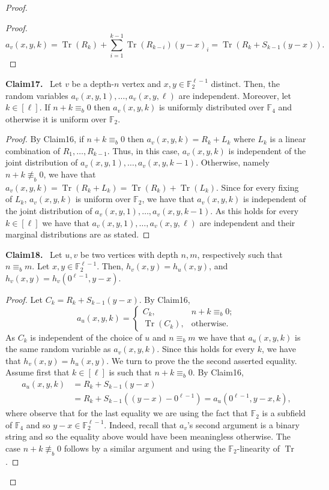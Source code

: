\documentclass[10pt,a4paper]{article}
\newenvironment{authorclaim}[1]{\par\medskip\noindent\textbf{#1.}\ \ignorespaces}{\par\medskip}
\begin{document}
\begin{proof}
\begin{proof}
\[
a_v(x,y,k)=\operatorname{Tr}(R_k)+\sum_{i=1}^{k-1}\operatorname{Tr}(R_{k-i})(y-x)_i
=\operatorname{Tr}(R_k+S_{k-1}(y-x)).
\]
\end{proof}
\begin{authorclaim}{Claim17}
Let $v$ be a depth-$n$ vertex and $x,y\in\mathbb F_2^{\ell-1}$ distinct. Then, the random variables $a_v(x,y,1),\ldots,a_v(x,y,\ell)$ are independent. Moreover, let $k\in[\ell]$. If $n+k\equiv_b0$ then $a_v(x,y,k)$ is uniformly distributed over $\mathbb F_4$ and otherwise it is uniform over $\mathbb F_2$.
\end{authorclaim}
\begin{proof}
By Claim16, if $n+k\equiv_b0$ then $a_v(x,y,k)=R_k+L_k$ where $L_k$ is a linear combination of $R_1,\ldots,R_{k-1}$. Thus, in this case, $a_v(x,y,k)$ is independent of the joint distribution of $a_v(x,y,1),\ldots,a_v(x,y,k-1)$. Otherwise, namely $n+k\not\equiv_b0$, we have that $a_v(x,y,k)=\operatorname{Tr}(R_k+L_k)=\operatorname{Tr}(R_k)+\operatorname{Tr}(L_k)$. Since for every fixing of $L_k$, $a_v(x,y,k)$ is uniform over $\mathbb F_2$, we have that $a_v(x,y,k)$ is independent of the joint distribution of $a_v(x,y,1),\ldots,a_v(x,y,k-1)$. As this holds for every $k\in[\ell]$ we have that $a_v(x,y,1),\ldots,a_v(x,y,\ell)$ are independent and their marginal distributions are as stated.
\end{proof}
\begin{authorclaim}{Claim18}
Let $u,v$ be two vertices with depth $n,m$, respectively such that $n\equiv_bm$. Let $x,y\in\mathbb F_2^{\ell-1}$. Then, $h_v(x,y)=h_u(x,y)$, and $h_v(x,y)=h_v(0^{\ell-1},y-x)$.
\end{authorclaim}
\begin{proof}
Let $C_k=R_k+S_{k-1}(y-x)$. By Claim16,
\[
a_u(x,y,k)=\begin{cases}C_k,&n+k\equiv_b0;\\\operatorname{Tr}(C_k),&\text{otherwise}.\end{cases}
\]
As $C_k$ is independent of the choice of $u$ and $n\equiv_bm$ we have that $a_u(x,y,k)$ is the same random variable as $a_v(x,y,k)$. Since this holds for every $k$, we have that $h_v(x,y)=h_u(x,y)$.
We turn to prove the the second asserted equality. Assume first that $k\in[\ell]$ is such that $n+k\equiv_b0$. By Claim16,
\begin{align*}
a_u(x,y,k)&=R_k+S_{k-1}(y-x)\\
&=R_k+S_{k-1}((y-x)-0^{\ell-1})
=a_u(0^{\ell-1},y-x,k),
\end{align*}
where observe that for the last equality we are using the fact that $\mathbb F_2$ is a subfield of $\mathbb F_4$ and so $y-x\in\mathbb F_2^{\ell-1}$. Indeed, recall that $a_v$'s second argument is a binary string and so the equality above would have been meaningless otherwise. The case $n+k\not\equiv_b0$ follows by a similar argument and using the $\mathbb F_2$-linearity of $\operatorname{Tr}$.

\end{proof}
\end{proof}
\end{document}
